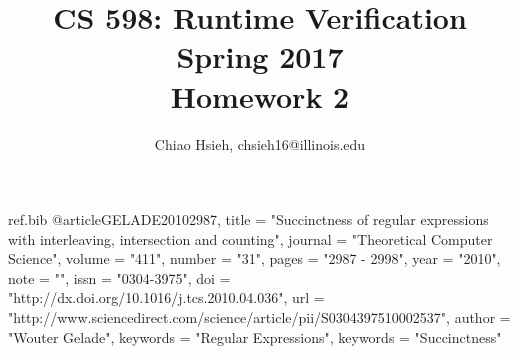\begin{filecontents}{ref.bib}
@article{GELADE20102987,
	title = "Succinctness of regular expressions with interleaving, intersection and counting",
	journal = "Theoretical Computer Science",
	volume = "411",
	number = "31",
	pages = "2987 - 2998",
	year = "2010",
	note = "",
	issn = "0304-3975",
	doi = "http://dx.doi.org/10.1016/j.tcs.2010.04.036",
	url = "http://www.sciencedirect.com/science/article/pii/S0304397510002537",
	author = "Wouter Gelade",
	keywords = "Regular Expressions",
	keywords = "Succinctness"
}
\end{filecontents}

\documentclass{article}

\usepackage[margin=3cm]{geometry}
\usepackage{amsmath}
\usepackage{amssymb}
\usepackage[noend]{algorithm2e}
\usepackage{xspace}
\usepackage{enumerate}
\usepackage{tikz}
\usetikzlibrary{positioning, automata}
\usepackage{caption}
\usepackage{subcaption}
\usepackage{float}

\title{\Large\bfseries CS 598: Runtime Verification \\
Spring 2017 \\
Homework 2}
\author{Chiao Hsieh, chsieh16@illinois.edu}


\maketitle

\newcommand{\FinTraces}{\ensuremath{\Sigma^*}\xspace}
\newcommand{\InfTraces}{\ensuremath{\Sigma^\omega}\xspace}
\newcommand{\prefixes}{\ensuremath{\mathtt{prefixes}}\xspace}
\newcommand{\Nat}{\ensuremath{\mathbb{N}}\xspace}
\newcommand{\Real}{\ensuremath{\mathbb{R}}\xspace}
\newcommand{\Bool}{\ensuremath{\mathbb{B}}\xspace}

\newcommand{\Lang}{\ensuremath{\mathcal{L}}}


